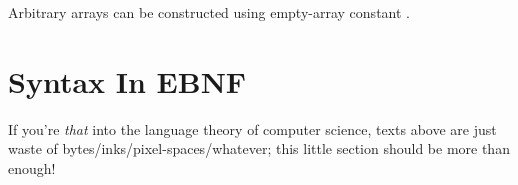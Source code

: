 Arbitrary arrays can be constructed using empty-array constant .

\section{Syntax In EBNF}

If you're \emph{that} into the language theory of computer science, texts above are just waste of bytes/inks/pixel-spaces/whatever; this little section should be more than enough!


